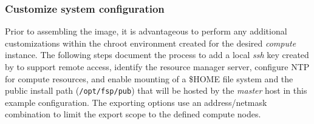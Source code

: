 \documentclass[letterpaper]{article}
\begin{document}



\subsubsection{Customize system configuration} \label{sec:master_customization}

Prior to assembling the image, it is advantageous to perform any additional
customizations within the chroot environment created for the desired {\em
  compute} instance. The following steps document the process to add a local
{\em ssh} key created by \Warewulf{} to support remote access, identify the
resource manager server, configure NTP for compute resources, and enable \NFS{}
mounting of a \$HOME file system and the public \FSP{} install path
(\texttt{/opt/fsp/pub}) that will be hosted by the {\em master} host in this
example configuration.  The \NFS{} exporting options use an address/netmask
combination to limit the export scope to the defined compute nodes.

\end{document}
